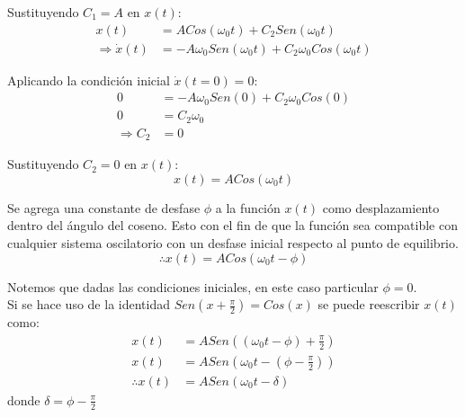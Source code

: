 Sustituyendo $C_{1}=A$ en $x(t)$:
\begin{align*}
    x(t) &= ACos(\omega_{0}t)+C_{2}Sen(\omega_{0}t)\\
    \Rightarrow \dot{x}(t) &= -A\omega_{0}Sen(\omega_{0}t) + C_{2}\omega_{0}Cos(\omega_{0}t)
\end{align*}

Aplicando la condición inicial $\dot{x}(t=0)=0$:
\begin{align*}
    0 &= -A\omega_{0}Sen(0) + C_{2}\omega_{0}Cos(0)\\
    0 &= C_{2}\omega_{0}\\
    \Rightarrow C_{2} &= 0
\end{align*}

Sustituyendo $C_{2}=0$ en $x(t)$:
\begin{equation*}
    x(t) = ACos(\omega_{0}t)
\end{equation*}

Se agrega una constante de desfase $\phi$ a la función $x(t)$ como desplazamiento dentro del ángulo del coseno. Esto con el fin de que la función sea compatible con cualquier sistema oscilatorio con un desfase inicial respecto al punto de equilibrio.
\begin{equation*}
    \therefore x(t) = ACos(\omega_{0}t-\phi)
\end{equation*}

Notemos que dadas las condiciones iniciales, en este caso particular $\phi=0$.\\
Si se hace uso de la identidad $Sen(x+\frac{\pi}{2}) = Cos(x)$ se puede reescribir $x(t)$ como:
\begin{align*}
    x(t) &= ASen((\omega_{0}t-\phi)+\frac{\pi}{2})\\
    x(t) &= ASen(\omega_{0}t-(\phi-\frac{\pi}{2}))\\
    \therefore x(t) &= ASen (\omega_{0}t-\delta)
\end{align*}
donde $\delta=\phi - \frac{\pi}{2}$